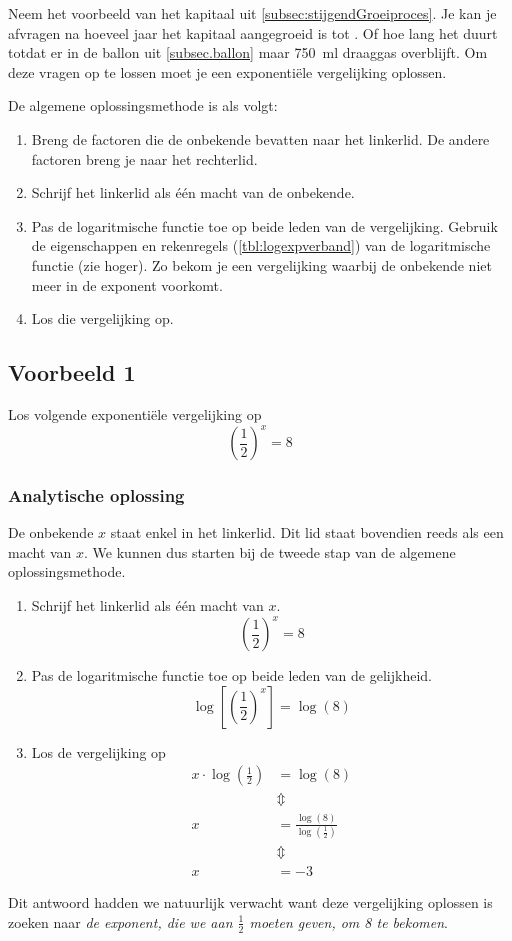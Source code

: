 Neem het voorbeeld van het kapitaal uit \cref{subsec:stijgendGroeiproces}. Je kan je afvragen na hoeveel jaar het kapitaal aangegroeid is tot . Of   hoe lang het duurt totdat er in de ballon uit \cref{subsec.ballon} maar \SI{750}{\ml} draaggas overblijft. Om deze vragen op te lossen moet je een exponentiële vergelijking oplossen.

De algemene oplossingsmethode is als volgt:
\begin{enumerate}
\item Breng de factoren die de onbekende bevatten naar het linkerlid. De andere factoren breng je naar het rechterlid.
\item Schrijf het linkerlid als \'e\'en macht van de onbekende.
    \item  Pas de logaritmische functie toe op beide leden van de vergelijking. Gebruik 
    de eigenschappen en rekenregels (\cref{tbl:logexpverband}) van de logaritmische functie (zie hoger). 
    Zo bekom je een vergelijking waarbij de onbekende niet meer in de exponent voorkomt.
    \item Los die vergelijking op.
\end{enumerate}

\subsection{Voorbeeld 1}
Los volgende exponenti\"{e}le vergelijking op 
\begin{equation}
\left( \frac{1}{2}\right)^{x}=8
\label{exp_vgl:een}
\end{equation}


 \subsubsection{Analytische oplossing}
 De onbekende $x$ staat enkel in het linkerlid. Dit lid staat bovendien reeds als een macht van $x$. 
We kunnen dus starten bij de tweede stap van de algemene oplossingsmethode.
\begin{enumerate}
\addtocounter{enumi}{1}
\item Schrijf het linkerlid als \'e\'en macht van $x$.
\[
\left(\frac{1}{2}\right)^{x} =  8 
\]
\item Pas de logaritmische functie toe op beide leden van de gelijkheid.
\[
\log\left[ \left(\frac{1}{2}\right)^{x}\right] =  \log(8)
\]
\item Los de vergelijking op
\begin{align*}
     x\cdot \log\left(\frac{1}{2}\right) &=  \log(8)  \\
      &\Updownarrow  \\
     x &=  \frac{\log(8)}{\log\left(\frac{1}{2}\right)}  \\
      &\Updownarrow  \\
     x &= -3
 \end{align*}
\end{enumerate}
 Dit antwoord hadden we natuurlijk verwacht want deze vergelijking
 oplossen is zoeken naar \emph{de exponent, die we aan $\frac{1}{2}$
 moeten geven, om 8 te bekomen}.

